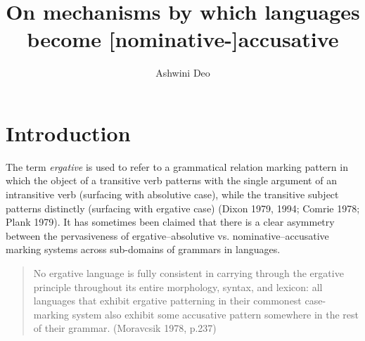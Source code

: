 \documentclass[output=paper,
modfonts
]{LSP/langsci}
\title{On mechanisms by which languages become [nominative-]accusative}
\author{%
Ashwini Deo\affiliation{The Ohio State University}}
\begin{document}
\maketitle


\section{Introduction}

The term \textit{ergative} is used to refer to a grammatical relation marking pattern in  which the object of
a transitive verb patterns with the single argument of an intransitive verb (surfacing with absolutive case), while the transitive
subject patterns distinctly (surfacing with ergative case) (Dixon 1979, 1994; Comrie 1978; Plank 1979).  It has sometimes been claimed  that there is a clear asymmetry between the pervasiveness of ergative--absolutive vs. nominative--accusative marking systems  across sub-domains of grammars  in languages. 

\begin{quote}
No ergative language is fully consistent in carrying through the ergative principle throughout
its entire morphology, syntax, and lexicon: all languages that exhibit ergative patterning in their
commonest case-marking system also exhibit some accusative pattern somewhere in the rest of
their grammar. (Moravcsik 1978, p.237)
\end{quote}
\end{document}
